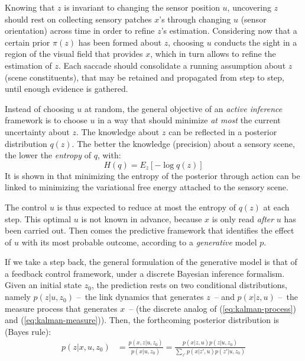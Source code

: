 \documentclass{article} %
\begin{document}
Knowing that $z$ is invariant to changing the sensor position $u$, uncovering $z$ should rest on
collecting sensory patches $x$'s through changing $u$ (sensor orientation) across time in order to refine $z$'s estimation. 
Considering now that a certain prior $\pi(z)$ has been formed about $z$, choosing  $u$ conducts the sight in a region of the visual field that provides $x$, which in turn allows to refine the estimation of $z$.
Each saccade should consolidate a running assumption about $z$ (scene constituents), that may be retained and propagated from step to step, until enough evidence is gathered.

Instead of choosing $u$ at random, the general objective of an \emph{active inference} framework is to choose $u$ in a way that should minimize \emph{at most} the current uncertainty about $z$. 
The knowledge about $z$ can be reflected in a posterior distribution $q(z)$. The better the knowledge (precision) about a sensory scene, the lower the \emph{entropy} of $q$, with:
$$H(q) = E_z[- \log q(z)]$$
It is shown in \cite{friston2012perceptions} that minimizing the entropy of the posterior through action can be linked to minimizing the variational free energy attached to the sensory scene. 




The control $u$ is thus expected to reduce at most the entropy of $q(z)$ at each step. This optimal $u$ is not known in advance, because $x$ is only read \emph{after} $u$ has been carried out. Then comes the predictive framework that identifies the effect of $u$ with its most probable outcome, according to a \emph{generative} model $p$.
	
If we take a step back, the general formulation of the generative model is that of a feedback control framework, under a discrete Bayesian inference formalism. %
Given an initial state $z_0$, the prediction rests on two conditional distributions, namely $p(z|u,z_0)$ --~the link dynamics that generates $z$~-- and $p(x|z,u)$ --~the measure process that generates $x$~--  (the discrete analog of (\ref{eq:kalman-process}) and (\ref{eq:kalman-measure})). %
Then, the forthcoming posterior distribution is (Bayes rule):
	\begin{align*}
	p(z|x,u,z_0) &= \frac{p(x,z|u,z_0)}{p(x|u,z_0)}
	= \frac{p(x|z,u) p(z|u,z_0)}{\sum_{z'}p(x|z',u) p(z'|u,z_0)}
	\end{align*}
	
\end{document}
